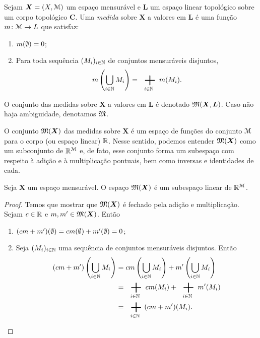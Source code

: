\begin{definition}
Sejam $\bm X = (X,\mathcal{M})$ um espaço mensurável e $\bm L$ um espaço linear topológico sobre um corpo topológico $\bm C$. Uma \emph{medida} sobre $\bm X$ a valores em $\bm L$ é uma função $m\colon \mathcal{M} \to L$ que satisfaz:
	\begin{enumerate}
	\item $m(\emptyset) = 0$;
	\item Para toda sequência $(M_i)_{i \in \mathbb{N}}$ de conjuntos mensuráveis disjuntos,
		\begin{equation*}
		\med\left( \bigcup_{i \in \N} M_i \right) = \sum_{i \in \N} \med(M_i).
		\end{equation*}
	\end{enumerate}
O conjunto das medidas sobre $\bm X$ a valores em $\bm L$ é denotado $\mathfrak{M}(\bm X,\bm L)$. Caso não haja ambiguidade, denotamos $\mathfrak{M}$.
\end{definition}

O conjunto $\mathfrak{M}(\bm X)$ das medidas sobre $\bm X$ é um espaço de funções do conjunto $\mathcal{M}$ para o corpo (ou espaço linear) $\mathbb{R}$. Nesse sentido, podemos entender $\mathfrak{M}(\bm X)$ como um subconjunto de $\mathbb{R}^{\mathcal{M}}$ e, de fato, esse conjunto forma um subespaço com respeito à adição e à multiplicação pontuais, bem como inversas e identidades de cada.

\begin{proposition}
Seja $\bm X$ um espaço mensurável. O espaço $\mathfrak{M}(\bm X)$ é um subespaço linear de $\mathbb{R}^{\mathcal{M}}$.
\end{proposition}
\begin{proof}
Temos que mostrar que $\mathfrak{M}(\bm X)$ é fechado pela adição e multiplicação. Sejam $c \in \mathbb{R}$ e $m,m' \in \mathfrak{M}(\bm X)$. Então
	\begin{enumerate}
	\item $(cm+m')(\emptyset) = cm(\emptyset)+m'(\emptyset) = 0$;
	\item Seja $(M_i)_{i \in \mathbb{N}}$ uma sequência de conjuntos mensuráveis disjuntos. Então
		\begin{align*}
		(c\med+\med')\left( \bigcup_{i \in \N} M_i \right) &= c\med\left( \bigcup_{i \in \N} M_i \right) + \med'\left( \bigcup_{i \in \N} M_i \right) \\
			&= \sum_{i \in \N} c\med(M_i) + \sum_{i \in \N} \med'(M_i) \\
			&= \sum_{i \in \N} (c\med+\med')(M_i).
		\end{align*}
	\end{enumerate}
\end{proof}

